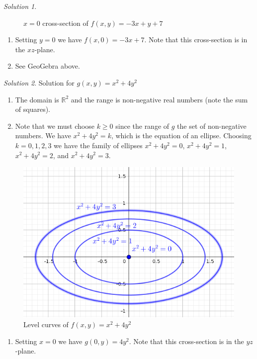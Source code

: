 \documentclass[
]{book}
\providecommand{\tightlist}{%
  \setlength{\itemsep}{0pt}\setlength{\parskip}{0pt}}
\theoremstyle{definition}
\theoremstyle{definition}
\theoremstyle{definition}
\theoremstyle{definition}
\theoremstyle{remark}
\newtheorem*{solution}{Solution}
\begin{document}
\begin{solution}
\begin{figure}
{}

\caption{$x=0$ cross-section of $f(x,y)=-3x+y+7$}\label{fig:unnamed-chunk-3}
\end{figure}

\begin{enumerate}
\def\labelenumi{\alph{enumi}.}
\setcounter{enumi}{3}
\item
  Setting \(y=0\) we have \(f(x,0)=-3x+7\). Note that this cross-section is in the \(xz\)-plane.
\item
  See GeoGebra above.
\end{enumerate}

\end{solution}

\begin{solution}

Solution for \(g(x,y)=x^2+4y^2\)

\begin{enumerate}
\def\labelenumi{\alph{enumi}.}
\item
  The domain is \(\mathbb{R}^2\) and the range is non-negative real numbers (note the sum of squares).
\item
  Note that we must choose \(k\geq 0\) since the range of \(g\) the set of non-negative numbers. We have \(x^2+4y^2=k\), which is the equation of an ellipse. Choosing \(k=0,1,2,3\) we have the family of ellipses \(x^2+4y^2=0\), \(x^2+4y^2=1\), \(x^2+4y^2=2\), and \(x^2+4y^2=3\).
\end{enumerate}

\begin{figure}

{\centering \includegraphics[width=0.5\linewidth]{images/lc-g} 

}

\caption{Level curves of $f(x,y)=x^2+4y^2$}\label{fig:unnamed-chunk-4}
\end{figure}

\begin{enumerate}
\def\labelenumi{\alph{enumi}.}
\setcounter{enumi}{2}
\tightlist
\item
  Setting \(x=0\) we have \(g(0,y)=4y^2\). Note that this cross-section is in the \(yz\)-plane.
\end{enumerate}


\end{solution}
\end{document}
